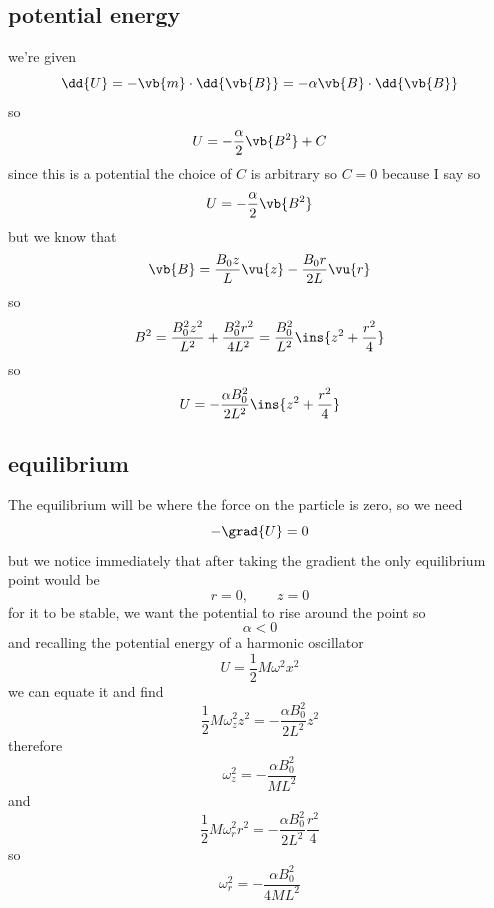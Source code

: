\subsection{potential energy}
we're given 
\begin{equation}
	\dd{U}=-\vb{m}\cdot\dd{\vb{B}}=-\alpha\vb{B}\cdot\dd{\vb{B}}
\end{equation}
so 
\begin{equation}
	U = -\frac{\alpha}{2}\vb{B^2}+C
\end{equation}
since this is a potential the choice of \(C\) is arbitrary so \(C=0\) because I say so 
\begin{equation}
	U = -\frac{\alpha}{2}\vb{B^2}
\end{equation}
but we know that 
\begin{equation}
	\vb{B} = \frac{B_0 z }{L}\vu{z}-\frac{B_0 r}{2L}\vu{r}
\end{equation}
so 
\begin{equation}
	B^2 = \frac{B_0^2 z^2}{L^2}+\frac{B_0^2 r^2}{4L^2}=\frac{B_0^2}{L^2}\ins{z^2+\frac{r^2}{4}}
\end{equation}
so 
\begin{equation}
	U = -\frac{\alpha B_0^2}{2L^2}\ins{z^2+\frac{r^2}{4}}
\end{equation}
\subsection{equilibrium}
The equilibrium will be where the force on the particle is zero, so we need 
\begin{equation}
	-\grad{U}=0
\end{equation}
but we notice immediately that after taking the gradient the only equilibrium point would be
\begin{equation}
	r=0,\qquad z=0
\end{equation}
for it to be stable, we want the potential to rise around the point so 
\begin{equation}
	\alpha<0
\end{equation}
and recalling the potential energy of a harmonic oscillator
\begin{equation}
	U = \frac{1}{2}M\omega^2x^2
\end{equation}
we can equate it and find 
\begin{equation}
	\frac{1}{2}M\omega_z^2z^2=-\frac{\alpha B_0^2}{2L^2}z^2
\end{equation}
therefore 
\begin{equation}
	\omega_z^2 = -\frac{\alpha B_0^2}{ML^2}
\end{equation}
and 
\begin{equation}
	\frac{1}{2}M\omega_r^2r^2=-\frac{\alpha B_0^2}{2L^2}\frac{r^2}{4}
\end{equation}
so 
\begin{equation}
	\omega_r^2 = -\frac{\alpha B_0^2}{4ML^2}
\end{equation}